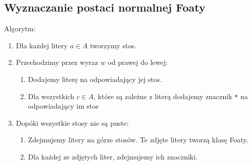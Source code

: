\documentclass[11pt]{article}
\begin{document}
\subsection*{Wyznaczanie postaci normalnej Foaty}
\label{sec:org0ea4b8b}
Algorytm:
\begin{enumerate}
\item Dla każdej litery \(a \in A\) tworzymy stos.
\item Przechodzimy przez wyraz \(w\) od prawej do lewej:
\begin{enumerate}
\item Dodajemy literę na odpowiadający jej stos.
\item Dla wszystkich \(c \in A\), które są zależne z literą dodajemy znacznik \texttt{*} na
odpowiadający im stos
\end{enumerate}
\item Dopóki wszystkie stosy nie są puste:
\begin{enumerate}
\item Zdejmujemy litery na górze stosów. Te zdjęte litery tworzą klasę Foaty.
\item Dla każdej ze zdjętych liter, zdejmujemy ich znaczniki.
\end{enumerate}
\end{enumerate}
\end{document}
